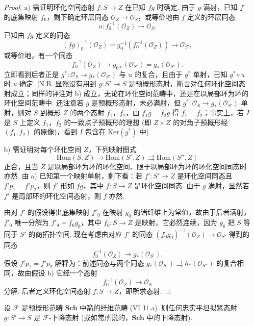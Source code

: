 \begin{proof}
a) 需证明环化空间态射 $f \colon S \to Z$ 在已知 $fg$ 时确定. 由于 $g$ 满射，已知 $f$ 的底集映射 $f_0$，剩下确定环层同态 $\mathcal{O}_Z \to \mathcal{O}_S$，或等价地由 $f$ 定义的环层同态
\[
u \colon f_0^{-1}(\mathcal{O}_Z) \longrightarrow \mathcal{O}_S.
\]
已知由 $fg$ 定义的同态
\[
(fg)_0^{-1}(\mathcal{O}_Z) = g_0^{-1}(f_0^{-1}(\mathcal{O}_Z)) \longrightarrow \mathcal{O}_{S'},
\]
或等价地，有一个同态
\[
f_0^{-1}(\mathcal{O}_Z) \longrightarrow g_{0*}(\mathcal{O}_{S'}) = g_*(\mathcal{O}_{S'}).
\]
立即看到后者正是 $g^{*} \colon \mathcal{O}_S \to g_*(\mathcal{O}_{S'})$ 与 $u$ 的复合，且由于 $g^{*}$ 单射，已知 $g^{*} \circ u$ 时 $u$ 确定. [N.B. 显然没有用到 $g \colon S' \to S$ 是预概形态射，断言对任何环化空间态射成立；同样的评注对 b) 成立，无论在环化空间范畴中，还是在以局部环为环的环化空间范畴中. 还注意若 $g$ 是预概形态射，未必满射，但 $g^{*} \colon \mathcal{O}_S \to g_*(\mathcal{O}_{S'})$ 单射，则对 $S$ 到概形 $Z$ 的两个态射 $f_1$，$f_2$，由 $f_1 g = f_2 g$ 得 $f_1 = f_2$；事实上，若 $I$ 是 $S$ 上定义 $f_1$，$f_2$ 的一致点子预概形的理想 (即 $Z \times Z$ 的对角子预概形经 $(f_1, f_2)$ 的原像)，看到 $I$ 包含在 $\mathrm{Ker}(g^{*})$ 中].

b) 需证明对每个环化空间 $Z$，下列映射图式
\[
\mathrm{Hom}(S, Z) \longrightarrow \mathrm{Hom}(S', Z) \rightrightarrows \mathrm{Hom}(S'', Z)
\]
正合，且当 $Z$ 是以局部环为环的环化空间、限于以局部环为环的环化空间同态时亦然. 由 a) 已知第一个映射单射，剩下看：若 $f' \colon S' \to Z$ 是环化空间同态且 $f' p_1 = f' p_2$，则 $f'$ 形如 $f g$，其中 $f \colon S \to Z$ 是环化空间同态. 由于 $g$ 满射，显然若 $f'$ 是局部环的环化空间态射，则 $f$ 亦然.

由对 $f'$ 的假设得出底集映射 $f'_0$ 在映射 $g_0$ 的诸纤维上为常值，故由于后者满射，$f'_0$ 唯一分解为 $f'_0 = f_0 g_0$，其中 $f_0 \colon S \to Z$ 是映射，它必然连续，因为 $g_0$ 把 $S$ 等同于 $S'$ 的商拓扑空间. 现在考虑由对应 $f'$ 的同态 $(f_0 g_0)^{-1}(\mathcal{O}_Z) \to \mathcal{O}_{S'}$ 得到的同态
\[
f_0^{-1}(\mathcal{O}_Z) \longrightarrow g_*(\mathcal{O}_{S'}).
\]
假设 $f' p_1 = f' p_2$ 解释为：前述同态与两个同态 $g_*(\mathcal{O}_{S'}) \rightrightarrows h_*(\mathcal{O}_{S''})$ 的复合相同，故由假设 b) 它经一个态射
\[
f_0^{-1}(\mathcal{O}_Z) \longrightarrow \mathcal{O}_S
\]
分解. 后者定义环化空间态射 $f \colon S \to Z$，即所求态射.
\end{proof}

\begin{theorem}\label{thm:VIII.5.2}
设 $\mathcal{F}$ 是预概形范畴 $\mathbf{Sch}$ 中箭的纤维范畴 (VI 11.a). 则任何忠实平坦拟紧态射 $g \colon S' \to S$ 是 $\mathcal{F}$-下降态射 (或如常所说的，$\mathbf{Sch}$ 中的下降态射).
\end{theorem}

